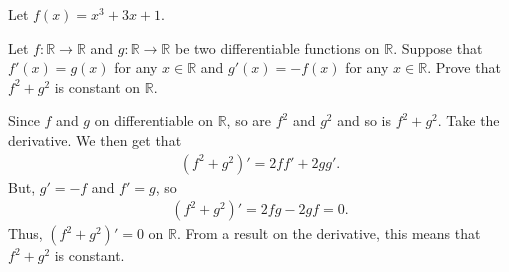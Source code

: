 \documentclass[addpoints, 12pt]{exam}%
\newcommand{\bR}{\mathbb{R}}
\newcommand{\ra}{\rightarrow}
\theoremstyle{definition}
\begin{document}
\begin{questions}
\newpage

\question
Let $f(x) = x^3 + 3x + 1$.
	

\newpage
	
\question[10]
Let $f : \bR \ra \bR$ and $g : \bR \ra \bR$ be two differentiable functions on $\bR$. Suppose that $f'(x)= g(x)$ for any $x \in \bR$ and $g'(x) = -f(x)$ for any $x \in \bR$. Prove that $f^2 + g^2$ is constant on $\bR$.

\begin{solution}
Since $f$ and $g$ on differentiable on $\bR$, so are $f^2$ and $g^2$ and so is $f^2 + g^2$. Take the derivative. We then get that
	\begin{align*}
	( f^2 + g^2)' = 2f f' + 2g g' .
	\end{align*}
But, $g' = -f$ and $f' = g$, so 
	\begin{align*}
	(f^2 + g^2)' = 2fg - 2gf = 0 .
	\end{align*}
Thus, $(f^2 + g^2)' = 0$ on $\bR$. From a result on the derivative, this means that $f^2 + g^2$ is constant.
\end{solution}
	
\end{questions}
\end{document}
